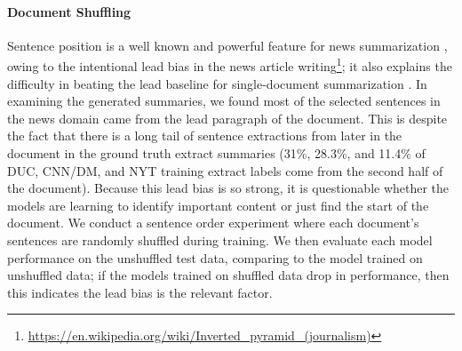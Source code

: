 

 
\paragraph{Document Shuffling} Sentence position is a well known and 
powerful feature for news summarization \citep{hong2014improving}, owing 
to the intentional lead bias in the news article writing\footnote{\url{https://en.wikipedia.org/wiki/Inverted_pyramid_(journalism)}}; it also explains the difficulty in beating
the lead baseline for single-document summarization 
\citep{nenkova2005automatic,rau:1999}.
In examining the generated summaries, we found
most of the selected sentences in the news domain came from the lead paragraph
of the document. This is despite the fact that there is a long tail of 
sentence extractions from later in the document in the ground truth extract 
summaries (31\%, 28.3\%, and 11.4\% of DUC, CNN/DM, and NYT training extract labels come 
from the second half of the document). 
Because this lead bias is so strong, it is questionable whether
the models are learning to identify important content or just find the start
of the document. We conduct a sentence order experiment where 
each document's sentences are randomly shuffled during training. We then
evaluate each model performance on the unshuffled test data, comparing to 
the model trained on unshuffled data; if the models trained on shuffled data
drop in performance, then this indicates the lead bias is the relevant factor.

